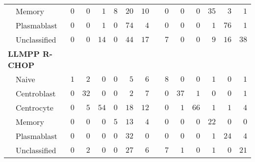 \begin{table}[!tbp]
{\begin{center}
\begin{tabular}{lrrrrrrcrrrrrr}
~~Memory&$0$&$ 0$&$  1$&$8$&$20$&$10$&&$ 0$&$ 0$&$  0$&$35$&$ 3$&$ 1$\tabularnewline
~~Plasmablast&$0$&$ 0$&$  1$&$0$&$74$&$ 4$&&$ 0$&$ 0$&$  0$&$ 1$&$76$&$ 1$\tabularnewline
~~Unclassified&$0$&$ 0$&$ 14$&$0$&$44$&$17$&&$ 7$&$ 0$&$  0$&$ 9$&$16$&$38$\tabularnewline
\hline
{\bfseries LLMPP R-CHOP}&&&&&&&&&&&&&\tabularnewline
~~Naive&$1$&$ 2$&$  0$&$0$&$ 5$&$ 6$&&$ 8$&$ 0$&$  0$&$ 1$&$ 0$&$ 1$\tabularnewline
~~Centroblast&$0$&$32$&$  0$&$0$&$ 2$&$ 7$&&$ 0$&$37$&$  1$&$ 0$&$ 0$&$ 1$\tabularnewline
~~Centrocyte&$0$&$ 5$&$ 54$&$0$&$18$&$12$&&$ 0$&$ 1$&$ 66$&$ 1$&$ 1$&$ 4$\tabularnewline
~~Memory&$0$&$ 0$&$  0$&$5$&$13$&$ 4$&&$ 0$&$ 0$&$  0$&$22$&$ 0$&$ 0$\tabularnewline
~~Plasmablast&$0$&$ 0$&$  0$&$0$&$32$&$ 0$&&$ 0$&$ 0$&$  0$&$ 1$&$24$&$ 4$\tabularnewline
~~Unclassified&$0$&$ 2$&$  0$&$0$&$27$&$ 6$&&$ 7$&$ 1$&$  0$&$ 1$&$ 0$&$21$\tabularnewline
\hline
\end{tabular}\end{center}}

\end{table}
